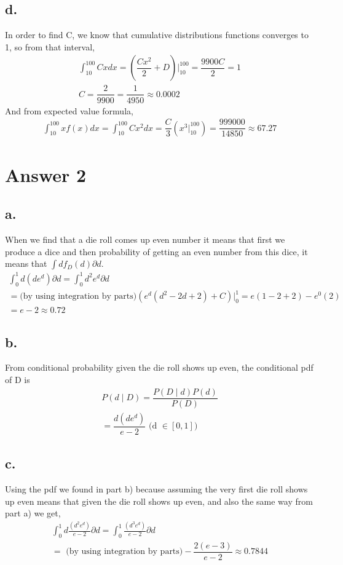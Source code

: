 \documentclass[12pt]{article}
\begin{document}
\subsection*{d.}
In order to find C, we know that cumulative distributions functions converges to 1, so from that interval,
\begin{gather*}
\int_{10}^{100} Cx dx =  (\dfrac{Cx^2}{2}+D)\Big|_{10}^{100} = \dfrac{9900C}{2} = 1 \\
C = \dfrac{2}{9900} = \dfrac{1}{4950} \approx 0.0002
\end{gather*}
And from expected value formula,
\begin{gather*}
    \int_{10}^{100} xf(x) dx = \int_{10}^{100} Cx^2 dx = \dfrac{C}{3}(x^3\Big|_{10}^{100}) = \dfrac{999000}{14850} \approx 67.27
\end{gather*}
\section*{Answer 2}

\subsection*{a.}
When we find that a die roll comes up even number it means that first we produce a dice and then probability of getting an even number from this dice, it means that $\int df_D(d)\partial d$.
\begin{gather*}
    \int_{0}^{1}d(de^d)\partial d = \int_{0}^{1} d^2e^d\partial d \\
    = \text{(by using integration by parts)} (e^d(d^2-2d+2)+C)\Big|_{0}^{1} =e(1-2+2)-e^0(2) \\
    =e-2 \approx 0.72
\end{gather*}
\subsection*{b.}
From conditional probability given the die roll shows up even, the conditional pdf of D is 
\begin{gather*}
    P(d \;|\; D) = \dfrac{P(D\;|\;d)P(d)}{P(D)} \\
    = \dfrac{d(de^d)}{e-2} \text{   (d $\in [0,1]$)}
\end{gather*}

\subsection*{c.}
Using the pdf we found in part b) because assuming the very first die roll shows up even means that given the die roll shows up even, and also the same way from part a) we get,
\begin{gather*}
    \int_{0}^{1}d \frac{(d^2e^d)}{e-2}\partial d = \int_{0}^{1}\frac{(d^3e^d)}{e-2}\partial d \\
    = \text{ (by using integration by parts)} - \dfrac{2(e-3)}{e-2} \approx 0.7844
\end{gather*}
\end{document}
